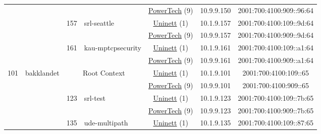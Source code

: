 \begin{small}
\begin{center}
\begin{longtable}{|c|c|c|c|c|c|c|c|}
  &  &  &  & \multicolumn{2}{|c|}{\tiny{\href{http://www.powertech.no}{PowerTech} (9)}} & \tiny{10.9.9.150} & \tiny{2001:700:4100:909::96:64} \\* \cline{3-3}\cline{4-4}\cline{5-5}\cline{6-6}\cline{7-7}\cline{8-8}
  &  & \multirow{2}{*}{\tiny{157}} & \multicolumn{1}{|l|}{\multirow{2}{*}{\tiny{srl-seattle}}} & \multicolumn{2}{|c|}{\tiny{\href{https://www.uninett.no}{Uninett} (1)}} & \tiny{10.1.9.157} & \tiny{2001:700:4100:109::9d:64} \\* \cline{5-5}\cline{6-6}\cline{7-7}\cline{8-8}
  &  &  &  & \multicolumn{2}{|c|}{\tiny{\href{http://www.powertech.no}{PowerTech} (9)}} & \tiny{10.9.9.157} & \tiny{2001:700:4100:909::9d:64} \\* \cline{3-3}\cline{4-4}\cline{5-5}\cline{6-6}\cline{7-7}\cline{8-8}
  &  & \multirow{2}{*}{\tiny{161}} & \multicolumn{1}{|l|}{\multirow{2}{*}{\tiny{kau-mptcpsecurity}}} & \multicolumn{2}{|c|}{\tiny{\href{https://www.uninett.no}{Uninett} (1)}} & \tiny{10.1.9.161} & \tiny{2001:700:4100:109::a1:64} \\* \cline{5-5}\cline{6-6}\cline{7-7}\cline{8-8}
  &  &  &  & \multicolumn{2}{|c|}{\tiny{\href{http://www.powertech.no}{PowerTech} (9)}} & \tiny{10.9.9.161} & \tiny{2001:700:4100:909::a1:64} \\ \hline
 \multirow{22}{*}{\tiny{101}} & \multicolumn{1}{|l|}{\multirow{22}{*}{\tiny{bakklandet}}} & \multicolumn{2}{|c|}{\multirow{2}{*}{\tiny{Root Context}}} & \multicolumn{2}{|c|}{\tiny{\href{https://www.uninett.no}{Uninett} (1)}} & \tiny{10.1.9.101} & \tiny{2001:700:4100:109::65} \\* \cline{5-5}\cline{6-6}\cline{7-7}\cline{8-8}
  &  & \multicolumn{2}{|c|}{} & \multicolumn{2}{|c|}{\tiny{\href{http://www.powertech.no}{PowerTech} (9)}} & \tiny{10.9.9.101} & \tiny{2001:700:4100:909::65} \\* \cline{3-3}\cline{4-4}\cline{5-5}\cline{6-6}\cline{7-7}\cline{8-8}
  &  & \multirow{2}{*}{\tiny{123}} & \multicolumn{1}{|l|}{\multirow{2}{*}{\tiny{srl-test}}} & \multicolumn{2}{|c|}{\tiny{\href{https://www.uninett.no}{Uninett} (1)}} & \tiny{10.1.9.123} & \tiny{2001:700:4100:109::7b:65} \\* \cline{5-5}\cline{6-6}\cline{7-7}\cline{8-8}
  &  &  &  & \multicolumn{2}{|c|}{\tiny{\href{http://www.powertech.no}{PowerTech} (9)}} & \tiny{10.9.9.123} & \tiny{2001:700:4100:909::7b:65} \\* \cline{3-3}\cline{4-4}\cline{5-5}\cline{6-6}\cline{7-7}\cline{8-8}
  &  & \multirow{2}{*}{\tiny{135}} & \multicolumn{1}{|l|}{\multirow{2}{*}{\tiny{ude-multipath}}} & \multicolumn{2}{|c|}{\tiny{\href{https://www.uninett.no}{Uninett} (1)}} & \tiny{10.1.9.135} & \tiny{2001:700:4100:109::87:65} \\* \cline{5-5}\cline{6-6}\cline{7-7}\cline{8-8}

\end{longtable}
\end{center}
\end{small}
